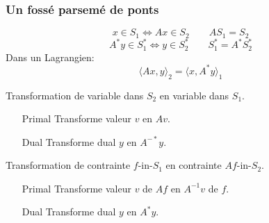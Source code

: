 \documentclass{beamer}
\begin{document}
  \begin{frame}
    \frametitle{Un fossé parsemé de ponts}
    \[ x \in S_1 \Leftrightarrow Ax \in S_2 \qquad AS_1 = S_2 \]
    \[ A^* y \in S_1^* \Leftrightarrow y \in S_2^* \qquad S_1^* = A^* S_2^* \]
    Dans un Lagrangien:
    \[ \langle Ax, y \rangle_2 = \langle x, A^* y \rangle_1 \]
    \vspace{-0.5cm}
    \begin{block}{Transformation de variable dans $S_2$ en variable dans $S_1$.}
%
      \begin{enumerate}
        \item[Primal] Transforme valeur $v$ en $Av$.
        \item[Dual] Transforme dual $y$ en $A^{-*}y$.
      \end{enumerate}
    \end{block}
    \begin{block}{Transformation de contrainte $f$-in-$S_1$ en contrainte $Af$-in-$S_2$.}

      \begin{enumerate}
        \item[Primal] Transforme valeur $v$ de $Af$ en $A^{-1}v$ de $f$.
        \item[Dual] Transforme dual $y$ en $A^*y$.
      \end{enumerate}
    \end{block}
  \end{frame}
\end{document}
